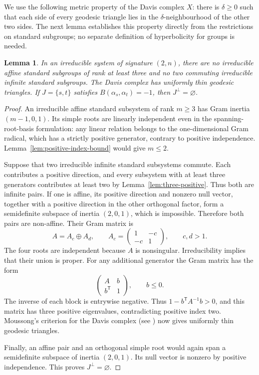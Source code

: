 \documentclass[11pt,reqno]{amsart}
\theoremstyle{plain}
\newtheorem{lemma}[theorem]{Lemma}
\theoremstyle{definition}
\theoremstyle{remark}
\numberwithin{equation}{section}
\begin{document}
We use the following metric property of the Davis complex $X$: there is
$\delta\geq0$ such that each side of every geodesic triangle lies in the
$\delta$-neighbourhood of the other two sides. The next lemma establishes
this property directly from the restrictions on standard subgroups; no
separate definition of hyperbolicity for groups is needed.

\begin{lemma}\label{lem:2n-hyperbolic}
In an irreducible system of signature $(2,n)$, there are no irreducible affine standard subgroups of rank at least three and no two commuting irreducible infinite standard subgroups. The Davis complex has uniformly thin geodesic triangles. If $J=\{s,t\}$ satisfies $B(\alpha_s,\alpha_t)=-1$, then $J^\perp=\varnothing$.
\end{lemma}
\begin{proof}
An irreducible affine standard subsystem of rank $m\geq3$ has Gram inertia $(m-1,0,1)$. Its simple roots are linearly independent even in the spanning-root-basis formulation: any linear relation belongs to the one-dimensional Gram radical, which has a strictly positive generator, contrary to positive independence. Lemma~\ref{lem:positive-index-bound} would give $m\leq2$.

Suppose that two irreducible infinite standard subsystems commute. Each contributes a positive direction, and every subsystem with at least three generators contributes at least two by Lemma~\ref{lem:three-positive}. Thus both are infinite pairs. If one is affine, its positive direction and nonzero null vector, together with a positive direction in the other orthogonal factor, form a semidefinite subspace of inertia $(2,0,1)$, which is impossible. Therefore both pairs are non-affine. Their Gram matrix is
\[
 A=A_c\oplus A_d,\qquad A_c=\begin{pmatrix}1&-c\\-c&1\end{pmatrix},\qquad c,d>1.
\]
The four roots are independent because $A$ is nonsingular. Irreducibility implies that their union is proper. For any additional generator the Gram matrix has the form
\[
 \begin{pmatrix}A&b\\b^{\mathsf T}&1\end{pmatrix},\qquad b\leq0.
\]
The inverse of each block is entrywise negative. Thus $1-b^{\mathsf T}A^{-1}b>0$, and this matrix has three positive eigenvalues, contradicting positive index two. Moussong's criterion for the Davis complex (see \cite{CapraceErratum,Krammer2009}) now gives uniformly thin geodesic triangles.

Finally, an affine pair and an orthogonal simple root would again span a semidefinite subspace of inertia $(2,0,1)$. Its null vector is nonzero by positive independence. This proves $J^\perp=\varnothing$.
\end{proof}
\end{document}
